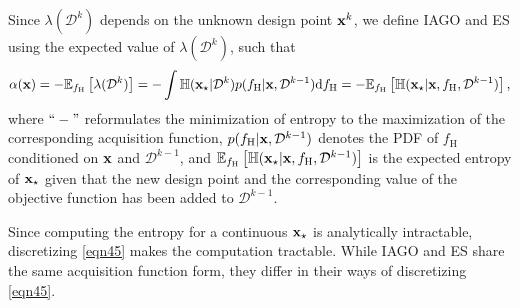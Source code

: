 \documentclass[journal ]{new-aiaa}
\begin{document}
	Since $\lambda(\mathcal{D}^{k})$ depends on the unknown design point ${\bf x}^k$, we define IAGO and ES using the expected value of $\lambda(\mathcal{D}^{k})$, such that
	\begin{equation}\label{eqn45}
		\alpha({\bf x}) = -\mathbb{E}_{f_\text{H}}\left[\lambda(\mathcal{D}^{k})\right]
		= -\int \mathbb{H}({\bf x}_\star|\mathcal{D}^{k})  p(f_\text{H}|{\bf x},\mathcal{D}^{k-1}) \text{d}f_\text{H}
		= -\mathbb{E}_{f_\text{H}}\left[\mathbb{H}({\bf x}_\star|{\bf x},f_\text{H},\mathcal{D}^{k-1})\right],
	\end{equation}
	where $``-"$ reformulates the minimization of entropy to the maximization of the corresponding acquisition function, $p(f_\text{H}|{\bf x},\mathcal{D}^{k-1})$ denotes the PDF of $f_\text{H}$ conditioned on $\bf x$ and $\mathcal{D}^{k-1}$, and $\mathbb{E}_{f_\text{H}}\left[\mathbb{H}({\bf x}_\star|{\bf x},f_\text{H},\mathcal{D}^{k-1})\right]$ is the expected entropy of ${\bf x}_\star$ given that the new design point and the corresponding value of the objective function has been added to $\mathcal{D}^{k-1}$.
	
	Since computing the entropy for a continuous ${\bf x}_\star$ is analytically intractable, discretizing \cref{eqn45} makes the computation tractable.
	While IAGO and ES share the same acquisition function form, they differ in their ways of discretizing \cref{eqn45}.
	
\end{document}
